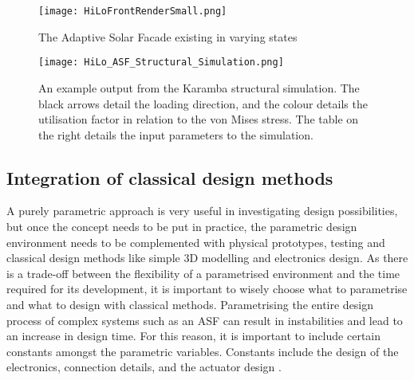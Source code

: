 \begin{figure}
\begin{center}
\texttt{[image: HiLoFrontRenderSmall.png]}
\caption{The Adaptive Solar Facade existing in varying states}
\label{fig:structure}
\end{center}
\end{figure}

\begin{figure}
\begin{center}
\texttt{[image: HiLo\_ASF\_Structural\_Simulation.png]}
\caption{An example output from the Karamba structural simulation. The black arrows detail the loading direction, and the colour details the utilisation factor in relation to the von Mises stress. The table on the right details the input parameters to the simulation.}
\label{fig:structureSettings}
\end{center}
\end{figure}




\subsection{Integration of classical design methods}

A purely parametric approach is very useful in investigating design possibilities, but once the concept needs to be put in practice, the parametric design environment needs to be complemented with physical prototypes, testing and classical design methods like simple 3D modelling and electronics design.
As there is a trade-off  between the  flexibility of a parametrised environment and the time required for its development, it is important to wisely choose what to parametrise and what to design with classical methods. Parametrising the entire design process of complex systems such as an ASF can result in instabilities and lead to an increase in design time. For this reason, it is important to include certain constants amongst the parametric variables. Constants include the design of the electronics, connection details, and the actuator design \cite{Svetozarevic2017a,svetozarevic2016soro}.


